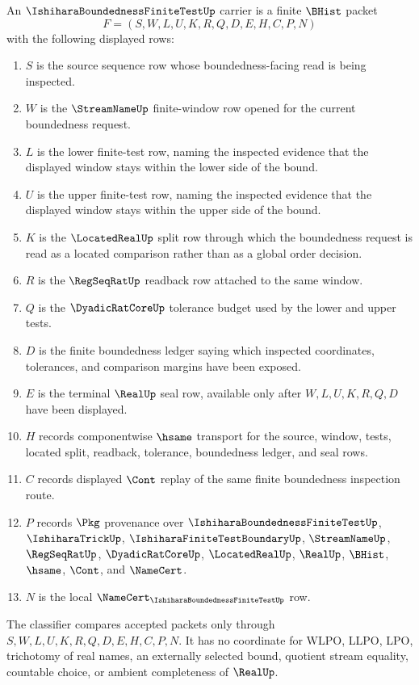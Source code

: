 \begin{definition}
\label{def:ishihara-boundedness-finite-test-carrier}
An $\IshiharaBoundednessFiniteTestUp$ carrier is a finite $\BHist$ packet
$$
F=(S,W,L,U,K,R,Q,D,E,H,C,P,N)
$$
with the following displayed rows:
\begin{enumerate}
\item $S$ is the source sequence row whose boundedness-facing read is being inspected.
\item $W$ is the $\StreamNameUp$ finite-window row opened for the current boundedness request.
\item $L$ is the lower finite-test row, naming the inspected evidence that the displayed window stays within the lower side of the bound.
\item $U$ is the upper finite-test row, naming the inspected evidence that the displayed window stays within the upper side of the bound.
\item $K$ is the $\LocatedRealUp$ split row through which the boundedness request is read as a located comparison rather than as a global order decision.
\item $R$ is the $\RegSeqRatUp$ readback row attached to the same window.
\item $Q$ is the $\DyadicRatCoreUp$ tolerance budget used by the lower and upper tests.
\item $D$ is the finite boundedness ledger saying which inspected coordinates, tolerances, and comparison margins have been exposed.
\item $E$ is the terminal $\RealUp$ seal row, available only after $W,L,U,K,R,Q,D$ have been displayed.
\item $H$ records componentwise $\hsame$ transport for the source, window, tests, located split, readback, tolerance, boundedness ledger, and seal rows.
\item $C$ records displayed $\Cont$ replay of the same finite boundedness inspection route.
\item $P$ records $\Pkg$ provenance over $\IshiharaBoundednessFiniteTestUp$, $\IshiharaTrickUp$, $\IshiharaFiniteTestBoundaryUp$, $\StreamNameUp$, $\RegSeqRatUp$, $\DyadicRatCoreUp$, $\LocatedRealUp$, $\RealUp$, $\BHist$, $\hsame$, $\Cont$, and $\NameCert$.
\item $N$ is the local $\NameCert_{\IshiharaBoundednessFiniteTestUp}$ row.
\end{enumerate}
The classifier compares accepted packets only through $S,W,L,U,K,R,Q,D,E,H,C,P,N$. It has no coordinate for WLPO, LLPO, LPO, trichotomy of real names, an externally selected bound, quotient stream equality, countable choice, or ambient completeness of $\RealUp$.
\end{definition}

